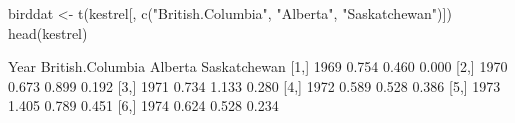 \begin{Schunk}
\begin{Sinput}
 birddat <- t(kestrel[, c("British.Columbia", "Alberta", "Saskatchewan")])
 head(kestrel)
\end{Sinput}
\begin{Soutput}
     Year British.Columbia Alberta Saskatchewan
[1,] 1969            0.754   0.460        0.000
[2,] 1970            0.673   0.899        0.192
[3,] 1971            0.734   1.133        0.280
[4,] 1972            0.589   0.528        0.386
[5,] 1973            1.405   0.789        0.451
[6,] 1974            0.624   0.528        0.234
\end{Soutput}
\end{Schunk}
